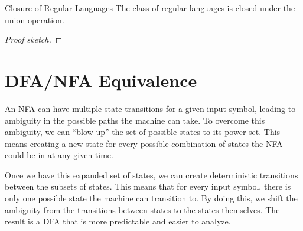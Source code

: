 
\begin{thmbox}{Closure of Regular Languages}{}
    The class of regular languages is closed under the union operation.
    \tcblower
    \begin{proof}[Proof sketch]
    \end{proof}
\end{thmbox}


\section{DFA/NFA Equivalence}

An NFA can have multiple state transitions for a given input symbol, leading to ambiguity in the possible paths the machine can take. To overcome this ambiguity, we can ``blow up'' the set of possible states to its power set. This means creating a new state for every possible combination of states the NFA could be in at any given time.

Once we have this expanded set of states, we can create deterministic transitions between the subsets of states. This means that for every input symbol, there is only one possible state the machine can transition to. By doing this, we shift the ambiguity from the transitions between states to the states themselves. The result is a DFA that is more predictable and easier to analyze.

